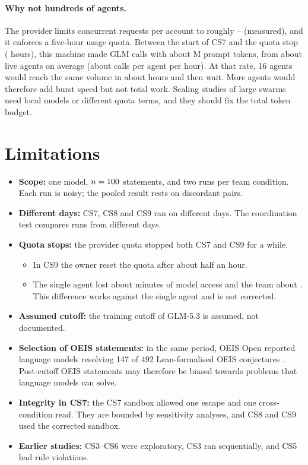 \documentclass[11pt]{article}
\begin{document}
\paragraph{Why not hundreds of agents.}
The provider limits concurrent requests per account to roughly \RateLow--\RateHigh{} (measured), and it enforces a five-hour usage
quota. Between the start of CS7 and the quota stop (\QuotaHours{} hours), this machine made \QuotaCalls{} GLM calls with about
\QuotaPromptM{}M prompt tokens, from about \QuotaAgents{} live agents on average (about \QuotaPerAgentH{} calls per agent
per hour). At that rate, 16 agents would reach the same volume in about \QuotaSixteenH{} hours and then wait. More agents
would therefore add burst speed but not total work. Scaling studies of large swarms need local models or different quota
terms, and they should fix the total token budget.

\section{Limitations}
\label{sec:limits}
\begin{itemize}
  \item \textbf{Scope:} one model, $n=100$ statements, and two runs per team condition. Each run is noisy; the
    pooled result rests on \PoolB{} discordant pairs.
  \item \textbf{Different days:} CS7, CS8 and CS9 ran on different days. The coordination test compares runs from
    different days.
  \item \textbf{Quota stops:} the provider quota stopped both CS7 and CS9 for a while.
    \begin{itemize}
      \item In CS9 the owner reset the quota after about half an hour.
      \item The single agent lost about \CSnineLossTS{} minutes of model access and the team about \CSnineLossTW.
        This difference works against the single agent and is not corrected.
    \end{itemize}
  \item \textbf{Assumed cutoff:} the training cutoff of GLM-5.3 is assumed, not documented.
  \item \textbf{Selection of OEIS statements:} in the same period, OEIS Open reported language models resolving 147 of
    492 Lean-formalised OEIS conjectures \citep{adamczewski2026oeisopen}. Post-cutoff OEIS statements may therefore be
    biased towards problems that language models can solve.
  \item \textbf{Integrity in CS7:} the CS7 sandbox allowed one escape and one cross-condition read. They are bounded by
    sensitivity analyses, and CS8 and CS9 used the corrected sandbox.
  \item \textbf{Earlier studies:} CS3--CS6 were exploratory, CS3 ran sequentially, and CS5 had rule violations.
\end{itemize}
\end{document}
